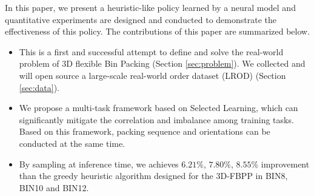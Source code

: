 In this paper, we present a heuristic-like policy learned by a neural model 
and quantitative experiments are designed and conducted to demonstrate 
the effectiveness of this policy. The contributions of this paper are 
summarized below.
\begin{itemize}	
	\item This is a first and successful attempt to define and solve 
	the real-world problem of 3D flexible Bin Packing 
	(Section \ref{sec:problem}).  We collected and will open source a 
	large-scale real-world order dataset (LROD) (Section \ref{sec:data}).
	\item We propose a multi-task framework based on Selected Learning, which can significantly mitigate the correlation and imbalance among training tasks. Based on this framework, packing sequence and orientations can be conducted at the same time. 
	\item By sampling at inference time, we achieves $6.21\%$, $7.80\%$, $8.55\%$ improvement than the greedy heuristic algorithm designed for the 3D-FBPP in BIN8, BIN10 and BIN12.
\end{itemize}

